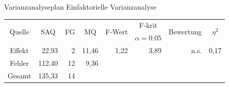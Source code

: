 \documentclass{beamer}
\begin{document}
	\begin{frame}[label=VAPlan]{Varianzanalyseplan}
		Einfaktorielle Varianzanalyse\\
		\begin{table}[]
			\centering
			\resizebox{\textwidth}{!} {
			\begin{tabular}{|c|r|r|r|r|r|r|r|}
				\hline
				\multirow{2}{*}{Quelle} & \multicolumn{1}{c|}{\multirow{2}{*}{SAQ}} & \multicolumn{1}{c|}{\multirow{2}{*}{FG}} & \multicolumn{1}{c|}{\multirow{2}{*}{MQ}} & \multicolumn{1}{c|}{\multirow{2}{*}{F-Wert}} & \multicolumn{1}{c|}{F-krit}        & \multicolumn{1}{c|}{\multirow{2}{*}{Bewertung}} & \multicolumn{1}{c|}{\multirow{2}{*}{$\eta^2$}} \\
				& \multicolumn{1}{c|}{}                     & \multicolumn{1}{c|}{}                    & \multicolumn{1}{c|}{}                    & \multicolumn{1}{c|}{}                        & \multicolumn{1}{c|}{$\alpha=0.05$} & \multicolumn{1}{c|}{}                           & \multicolumn{1}{c|}{}                          \\ \hline
				Effekt                  & 22,93                                     & 2                                        & 11,46                                    & 1,22                                         & 3,89                               & n.s.                                            & 0,17                                           \\ \hline
				Fehler                  & 112,40                                    & 12                                       & 9,36                                     &                                              &                                    &                                                 &                                                \\ \hline
				Gesamt                  & 135,33                                    & 14                                       &                                          &                                              &                                    &                                                 &                                                \\ \hline
			\end{tabular}
		}
		\end{table}
		
	\end{frame}
	
\end{document}
